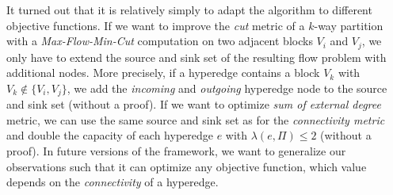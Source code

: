 It turned out that it is relatively simply to adapt the algorithm to different objective
functions. If we want to improve the \emph{cut} metric of a $k$-way partition with a 
\emph{Max-Flow-Min-Cut} computation on two adjacent blocks $V_i$ and $V_j$, we only have to extend the
source and sink set of the resulting flow problem with additional nodes. More precisely,
if a hyperedge contains a block $V_k$ with $V_k \notin \{V_i,V_j\}$, we add the
\emph{incoming} and \emph{outgoing} hyperedge node to the source and sink set (without a proof).
If we want to optimize \emph{sum of external degree} metric, we can use the same source and
sink set as for the \emph{connectivity metric} and double the capacity of each hyperedge $e$
with $\lambda(e,\Pi) \le 2$ (without a proof). In future versions of the framework, we want to
generalize our observations such that it can optimize any objective function, which value depends
on the \emph{connectivity} of a hyperedge.

